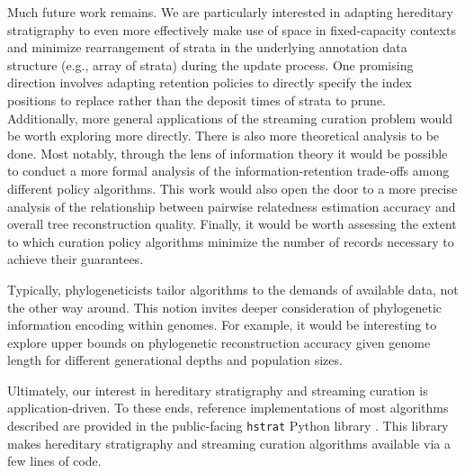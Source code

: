 Much future work remains.
We are particularly interested in adapting hereditary stratigraphy to even more effectively make use of space in fixed-capacity contexts and minimize rearrangement of strata in the underlying annotation data structure (e.g., array of strata) during the update process.
One promising direction involves adapting retention policies to directly specify the index positions to replace rather than the deposit times of strata to prune.
Additionally, more general applications of the streaming curation problem would be worth exploring more directly.
There is also more theoretical analysis to be done.
Most notably, through the lens of information theory it would be possible to conduct a more formal analysis of the information-retention trade-offs among different policy algorithms. 
This work would also open the door to a more precise analysis of the relationship between pairwise relatedness estimation accuracy and overall tree reconstruction quality.
Finally, it would be worth assessing the extent to which curation policy algorithms minimize the number of records necessary to achieve their guarantees.

Typically, phylogeneticists tailor algorithms to the demands of available data, not the other way around.
This notion invites deeper consideration of phylogenetic information encoding within genomes.
For example, it would be interesting to explore upper bounds on phylogenetic reconstruction accuracy given genome length for different generational depths and population sizes.

Ultimately, our interest in hereditary stratigraphy and streaming curation is application-driven.
To these ends, reference implementations of most algorithms described are provided in the public-facing \texttt{hstrat} Python library \citep{moreno2022hstrat}.
This library makes hereditary stratigraphy and streaming curation algorithms available via a few lines of code.
